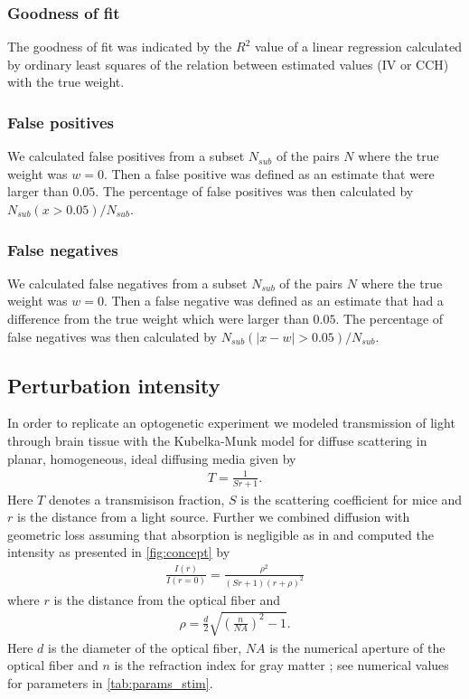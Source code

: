 \documentclass[11pt]{article}
\begin{document}
\subsubsection{Goodness of fit}
The goodness of fit was indicated by the $R^2$ value of a linear regression calculated by ordinary least squares \citep{seabold2010statsmodels} of the relation between estimated values (IV or CCH) with the true weight.

\subsubsection{False positives}
We calculated false positives from a subset $N_{sub}$ of the pairs $N$ where the true weight was $w = 0$. 
Then a false positive was defined as an estimate that were larger than $0.05$. 
The percentage of false positives was then calculated by $N_{sub}(x > 0.05) / N_{sub}$.

\subsubsection{False negatives}
We calculated false negatives from a subset $N_{sub}$ of the pairs $N$ where the true weight was $w = 0$.  
Then a false negative was defined as an estimate that had a difference from the true weight which were larger than $0.05$. 
The percentage of false negatives was then calculated by $N_{sub}(|x - w| > 0.05) / N_{sub}$.

\subsection{Perturbation intensity}\label{sec:method:opto}
In order to replicate an optogenetic experiment we modeled transmission of light through brain tissue with the Kubelka-Munk model for diffuse scattering in planar, homogeneous, ideal diffusing media \citep{Ho2017} given by
\begin{align}
T = \frac{1}{Sr + 1}.
\end{align}
Here $ T $ denotes a transmisison fraction, $ S $ is the scattering coefficient for mice \citep{Aravanis2007} and $ r $ is the distance from a light source. 
Further we combined diffusion with geometric loss assuming that absorption is negligible as in \cite{Aravanis2007} and computed the intensity as presented in \cref{fig:concept} by
\begin{align}
\label{eq:intensity}
\frac{I(r)}{I(r=0)} = \frac{\rho^2}{(Sr + 1)(r + \rho)^2}
\end{align}
where $ r $ is the distance from the optical fiber and
\begin{align}
\rho = \frac{d}{2}\sqrt{\left(\frac{n}{NA}\right)^2 - 1}.
\end{align}
Here $ d $ is the diameter of the optical fiber, $ NA $ is the numerical aperture of the optical fiber and $ n $ is the refraction index for gray matter \citep{Ho2017}; see numerical values for parameters in \cref{tab:params_stim}.
\end{document}
